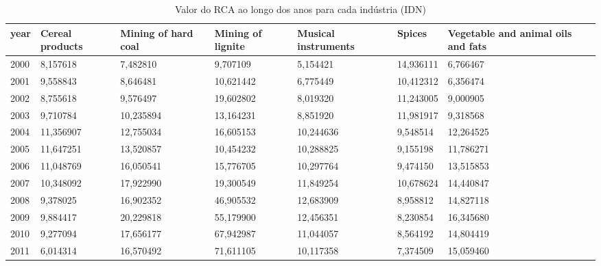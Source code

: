 \begin{table}
\centering
\caption{Valor do RCA ao longo dos anos para cada indústria (IDN)}
\begin{tabular}{p{1cm}p{2cm}p{2cm}p{2cm}p{2cm}p{2cm}p{2cm}}
\toprule
 year &  Cereal products &  Mining of hard coal &  Mining of lignite &  Musical instruments &    Spices &  Vegetable and animal oils and fats \\
\midrule
 2000 &         8,157618 &             7,482810 &           9,707109 &             5,154421 & 14,936111 &                            6,766467 \\
 2001 &         9,558843 &             8,646481 &          10,621442 &             6,775449 & 10,412312 &                            6,356474 \\
 2002 &         8,755618 &             9,576497 &          19,602802 &             8,019320 & 11,243005 &                            9,000905 \\
 2003 &         9,710784 &            10,235894 &          13,164231 &             8,851920 & 11,981917 &                            9,318568 \\
 2004 &        11,356907 &            12,755034 &          16,605153 &            10,244636 &  9,548514 &                           12,264525 \\
 2005 &        11,647251 &            13,520857 &          10,454232 &            10,288825 &  9,155198 &                           11,786271 \\
 2006 &        11,048769 &            16,050541 &          15,776705 &            10,297764 &  9,474150 &                           13,515853 \\
 2007 &        10,348092 &            17,922990 &          19,300549 &            11,849254 & 10,678624 &                           14,440847 \\
 2008 &         9,378025 &            16,902352 &          46,905532 &            12,683909 &  8,958812 &                           14,827118 \\
 2009 &         9,884417 &            20,229818 &          55,179900 &            12,456351 &  8,230854 &                           16,345680 \\
 2010 &         9,277094 &            17,656177 &          67,942987 &            11,044057 &  8,564192 &                           14,804419 \\
 2011 &         6,014314 &            16,570492 &          71,611105 &            10,117358 &  7,374509 &                           15,059460 \\

\end{tabular}
\end{table}

